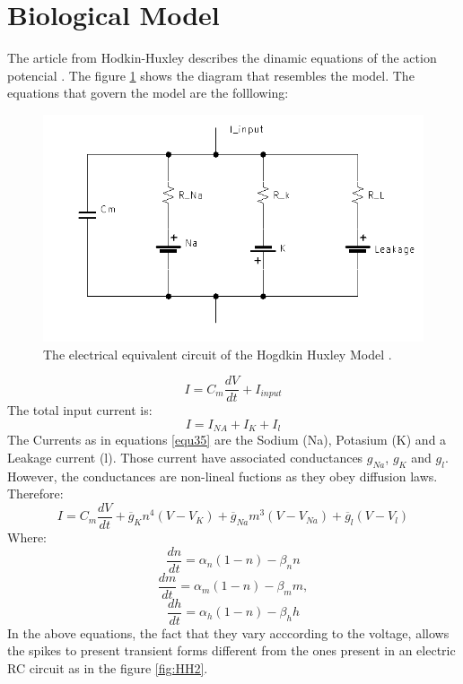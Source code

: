 \documentclass[journal]{IEEEtai}
\begin{document}
\section{Biological Model}
The article from Hodkin-Huxley describes the dinamic equations of the action potencial \cite{Hodgkin}. The figure \ref{fig:HH} shows the diagram that resembles the model. The equations that govern the model are the folllowing:
\begin{figure}
\centering
\includegraphics[width=\linewidth]{Hodgkin_Huxley.png}
\caption{The electrical equivalent circuit of the Hogdkin Huxley Model \cite{Huxley}.}
 \label{fig:HH}
\end{figure}
\begin{equation}\label{equ35}
I = C_{m}\frac{dV}{dt}+I_{input}
\end{equation}
The total input current is:
\begin{equation}\label{equ36}
I = I_{NA}+I_{K}+I_{l}
\end{equation}
The Currents as in equations \eqref{equ35} are the Sodium (Na), Potasium (K) and a Leakage current (l). Those current have associated conductances $g_{Na}$, $g_{K}$ and  $g_{l}$.  However, the conductances are non-lineal fuctions as they obey diffusion laws. Therefore:
\begin{equation}\label{equ37}
I = C_{m}\frac{dV}{dt}+\overline{g}_{K}n^{4}(V-V_{K})+\overline{g}_{Na}m^{3}(V-V_{Na})+\overline{g}_{l}(V-V_{l})
\end{equation}
Where:
\begin{equation}\label{equ38}
\frac{dn}{dt}=\alpha_{n}(1-n)-\beta_{n}n
\end{equation}
\begin{equation}\label{equ39}
\frac{dm}{dt}=\alpha_{m}(1-n)-\beta_{m}m,
\end{equation}
\begin{equation}\label{equ40}
\frac{dh}{dt}=\alpha_{h}(1-n)-\beta_{h}h
\end{equation}
In the above equations, the fact that they vary acccording to the voltage, allows the spikes to present transient forms different from the ones present in an electric RC circuit as in the figure \ref{fig:HH2}.
\end{document}
